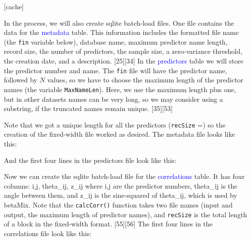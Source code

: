 \documentclass[a4paper,10pt]{article}
\let\code\texttt
\newcommand{\pkg}[1]{{\fontshape{it}\selectfont #1}}
\newcommand{\sqltbl}[1]{{\textcolor{blue}{#1}}}
\begin{document}
[cache]

In the process, we will also create sqlite batch-load files. One file contains the data for the \sqltbl{metadata} table. This information includes the formatted file name (the \code{fin} variable below), database name, maximum predictor name length, record size, the number of predictors, the sample size, a zero-variance threshold, the creation date, and a description.
[25][34]
In the \sqltbl{predictors} table we will store the predictor number and name. The \code{fin} file will have the predictor name, followed by $N$ values, so we have to choose the maximum length of the predictor names (the variable \code{MaxNameLen}). Here, we use the maximum length plus one, but in other datasets names can be very long, so we may consider using a substring, if the truncated names remain unique. 
[35][53]

Note that we got a unique length for all the predictors (\code{recSize} =) so the creation of the fixed-width file worked as desired. The metadata file looks like this:



And the first four lines in the predictors file look like this:


Now we can create the sqlite batch-load file for the \sqltbl{correlations} table. It has four columns: i,j,  theta\_ij, z\_ij where i,j are the predictor numbers, theta\_ij is the angle between them, and z\_ij is the sine-squared of theta\_ij, which is used by \pkg{betaMix}.
Note that the \code{calcCorr()} function takes two file names (input and output, the maximum length of predictor names), and \code{recSize} is the total length of a block in the fixed-width format.
[55][56]
The first four lines in the correlations file look like this:

\end{document}
